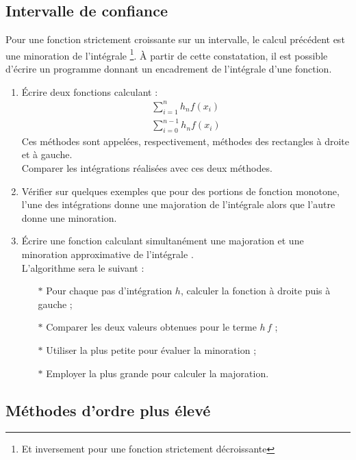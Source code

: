 \subsection{Intervalle de confiance}
Pour une fonction strictement croissante  sur un intervalle, le calcul
précédent  est une  minoration  de l'intégrale \footnote{Et inversement pour  une
fonction strictement décroissante}. À  partir de cette constatation, il
est  possible   d'écrire  un  programme  donnant   un  encadrement  de
l'intégrale d'une fonction.
\begin{enumerate}
\item Écrire deux fonctions calculant :
  \begin{eqnarray*}
    \sum_{i=1}^n h_n f(x_i)\\ \sum_{i=0}^{n-1}h_n f(x_i)
  \end{eqnarray*}
  Ces méthodes sont appelées,  respectivement, méthodes des rectangles
  à droite et  à gauche.  \\ Comparer les  intégrations réalisées avec
  ces deux méthodes.

\item  Vérifier  sur  quelques  exemples  que  pour  des  portions  de
  fonction monotone, l'une des  intégrations donne une majoration de
  l'intégrale alors que l'autre donne une minoration.  %
\item Écrire  une fonction  calculant simultanément une  majoration et
  une       minoration        approximative       de       l'intégrale
  .\\ L'algorithme sera le suivant :
  \begin{itemize}
  \item[$\ast$]  Pour  chaque  pas   d'intégration  $h$,  calculer  la
    fonction à droite puis à gauche ;
  \item[$\ast$] Comparer les deux valeurs obtenues pour le terme $h\,f$ ;
  \item[$\ast$] Utiliser la plus petite pour évaluer la minoration ;
  \item[$\ast$] Employer la plus grande pour calculer la majoration.
\end{itemize}
\end{enumerate}

\subsection{Méthodes d'ordre plus élevé {\sc[Facultatif]}}


